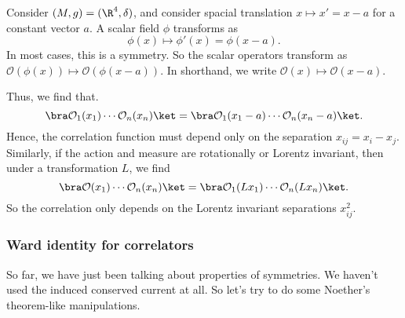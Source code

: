 \documentclass[a4paper]{article}
\begin{document}
\begin{eg}
  Consider $(M, g) = (\R^4, \delta)$, and consider spacial translation $x \mapsto x' = x - a$ for a constant vector $a$. A scalar field $\phi$ transforms as
  \[
    \phi(x) \mapsto \phi'(x) = \phi(x - a).
  \]
  In most cases, this is a symmetry. So the scalar operators transform as $\mathcal{O}(\phi(x)) \mapsto \mathcal{O}(\phi(x - a))$. In shorthand, we write $\mathcal{O}(x) \mapsto \mathcal{O}(x - a)$.

  Thus, we find that.
  \[
    \bra \mathcal{O}_1(x_1) \cdots \mathcal{O}_n(x_n)\ket = \bra \mathcal{O}_1(x_1 - a) \cdots \mathcal{O}_n(x_n - a)\ket.
  \]
  Hence, the correlation function must depend only on the separation $x_{ij} = x_i - x_j$. Similarly, if the action and measure are rotationally or Lorentz invariant, then under a transformation $L$, we find
  \[
    \bra \mathcal{O}(x_1) \cdots \mathcal{O}_n(x_n)\ket = \bra \mathcal{O}_1(L x_1) \cdots \mathcal{O}_n (L x_n)\ket.
  \]
  So the correlation only depends on the Lorentz invariant separations $x_{ij}^2$.
\end{eg}

\subsubsection*{Ward identity for correlators}
So far, we have just been talking about properties of symmetries. We haven't used the induced conserved current at all. So let's try to do some Noether's theorem-like manipulations.
\end{document}
